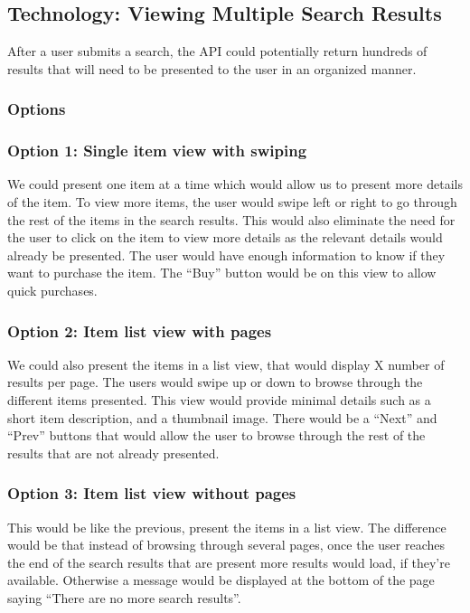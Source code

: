 \documentclass[journal,compsoc, 10pt, draftclsnofoot, onecolumn]{IEEEtran}
\begin{document}
\subsection{Technology: Viewing Multiple Search Results}
After a user submits a search, the API could potentially return hundreds of results
that will need to be presented to the user in an organized manner.

\subsubsection{Options}
\subsubsection*{Option 1: Single item view with swiping}
We could present one item at a time which would allow us to present more details of
the item. To view more items, the user would swipe left or right to go through the 
rest of the items in the search results. This would also eliminate the need for the 
user to click on the item to view more details as the relevant details would already 
be presented. The user would have enough information to know if they want to 
purchase the item. The ``Buy'' button would be on this view to allow quick purchases. 
\subsubsection*{Option 2: Item list view with pages}

We could also present the items in a list view, that would display X number of 
results per page. The users would swipe up or down to browse through the different 
items presented. This view would provide minimal details such as a short item 
description, and a thumbnail image. There would be a ``Next'' and ``Prev'' buttons 
that would allow the user to browse through the rest of the results that are not 
already presented.

\subsubsection*{Option 3: Item list view without pages}
This would be like the previous, present the items in a list view. The difference 
would be that instead of browsing through several pages, once the user reaches the 
end of the search results that are present more results would load, if they're 
available. Otherwise a message would be displayed at the bottom of the page saying 
``There are no more search results''.
\end{document}
